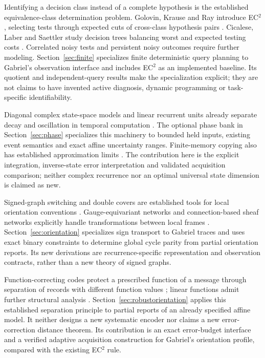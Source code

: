 \documentclass[11pt,a4paper]{article}
\theoremstyle{definition}\newtheorem{definition}[theorem]{Definition}
\begin{document}
Identifying a decision class instead of a complete hypothesis is the established equivalence-class determination problem. Golovin, Krause and Ray introduce EC$^2$, selecting tests through expected cuts of cross-class hypothesis pairs \cite{golovin2010}. Cicalese, Laber and Saettler study decision trees balancing worst and expected testing costs \cite{cicalese2014}. Correlated noisy tests \cite{chen2017} and persistent noisy outcomes \cite{jia2024} require further modeling. Section~\ref{sec:finite} specializes finite deterministic query planning to Gabriel's observation interface and includes EC$^2$ as an implemented baseline. Its quotient and independent-query results make the specialization explicit; they are not claims to have invented active diagnosis, dynamic programming or task-specific identifiability.

Diagonal complex state-space models and linear recurrent units already separate decay and oscillation in temporal computation \cite{gu2022diagonal,orvieto2023}. The optional phase bank in Section~\ref{sec:phase} specializes this machinery to bounded held inputs, existing event semantics and exact affine uncertainty ranges. Finite-memory copying also has established approximation limits \cite{francois2025}. The contribution here is the explicit integration, inverse-state error interpretation and validated acquisition comparison; neither complex recurrence nor an optimal universal state dimension is claimed as new.

Signed-graph switching and double covers are established tools for local orientation conventions \cite{zaslavsky1982}. Gauge-equivariant networks and connection-based sheaf networks explicitly handle transformations between local frames \cite{cohen2019gauge,barbero2022}. Section~\ref{sec:orientation} specializes sign transport to Gabriel traces and uses exact binary constraints to determine global cycle parity from partial orientation reports. Its new derivations are recurrence-specific representation and observation contracts, rather than a new theory of signed graphs.

Function-correcting codes protect a prescribed function of a message through separation of records with different function values \cite{lenz2023fcc}; linear functions admit further structural analysis \cite{premlal2025fcc}. Section~\ref{sec:robustorientation} applies this established separation principle to partial reports of an already specified affine model. It neither designs a new systematic encoder nor claims a new error-correction distance theorem. Its contribution is an exact error-budget interface and a verified adaptive acquisition construction for Gabriel's orientation profile, compared with the existing EC$^2$ rule.
\end{document}
